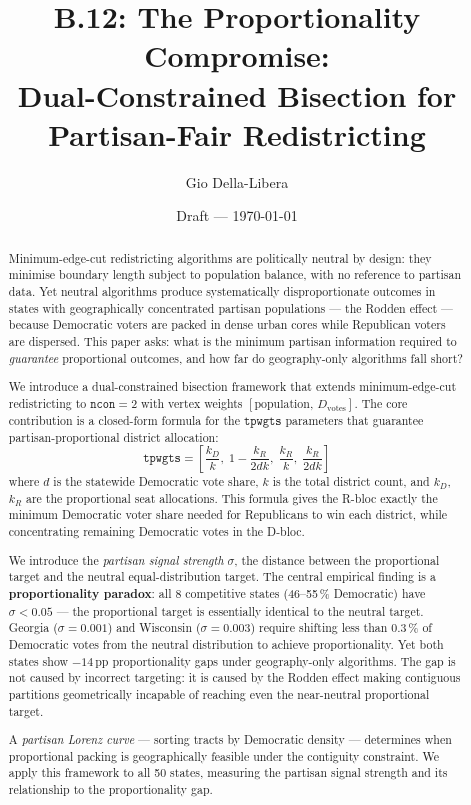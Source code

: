 \documentclass[12pt]{article}
\title{B.12: The Proportionality Compromise:\\
Dual-Constrained Bisection for Partisan-Fair Redistricting}
\author{Gio Della-Libera}
\date{Draft --- \today}
\begin{document}
\maketitle

\begin{abstract}
Minimum-edge-cut redistricting algorithms are politically neutral by design:
they minimise boundary length subject to population balance, with no reference
to partisan data.
Yet neutral algorithms produce systematically disproportionate outcomes in
states with geographically concentrated partisan populations --- the Rodden
effect --- because Democratic voters are packed in dense urban cores while
Republican voters are dispersed.
This paper asks: what is the minimum partisan information required to
\emph{guarantee} proportional outcomes, and how far do geography-only
algorithms fall short?

We introduce a dual-constrained bisection framework that extends minimum-edge-cut
redistricting to $\mathtt{ncon}=2$ with vertex weights
$[\text{population},\, D_{\text{votes}}]$.
The core contribution is a closed-form formula for the $\mathtt{tpwgts}$
parameters that guarantee partisan-proportional district allocation:
\[
  \mathtt{tpwgts} = \left[\frac{k_D}{k},\; 1 - \frac{k_R}{2dk},\;
                          \frac{k_R}{k},\; \frac{k_R}{2dk}\right]
\]
where $d$ is the statewide Democratic vote share, $k$ is the total district
count, and $k_D$, $k_R$ are the proportional seat allocations.
This formula gives the R-bloc exactly the minimum Democratic voter share
needed for Republicans to win each district, while concentrating remaining
Democratic votes in the D-bloc.

We introduce the \emph{partisan signal strength} $\sigma$, the distance between
the proportional target and the neutral equal-distribution target.
The central empirical finding is a \textbf{proportionality paradox}: all 8
competitive states (46--55\,\% Democratic) have $\sigma < 0.05$ --- the
proportional target is essentially identical to the neutral target.
Georgia ($\sigma = 0.001$) and Wisconsin ($\sigma = 0.003$) require shifting
less than 0.3\,\% of Democratic votes from the neutral distribution to achieve
proportionality.
Yet both states show $-14$\,pp proportionality gaps under geography-only algorithms.
The gap is not caused by incorrect targeting: it is caused by the Rodden effect
making contiguous partitions geometrically incapable of reaching even the
near-neutral proportional target.

A \emph{partisan Lorenz curve} --- sorting tracts by Democratic density ---
determines when proportional packing is geographically feasible under the
contiguity constraint.
We apply this framework to all 50 states, measuring the partisan signal strength
and its relationship to the proportionality gap.


\end{abstract}
\end{document}
